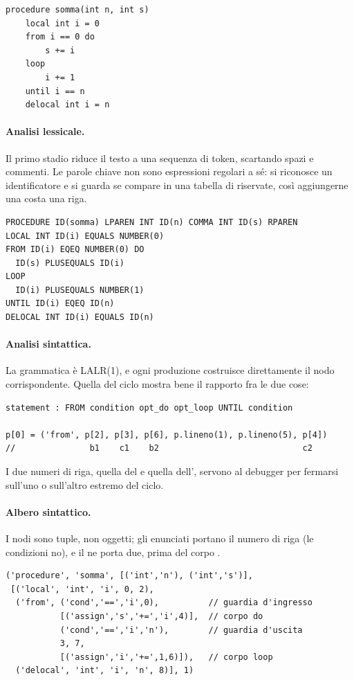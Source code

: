 \begin{lstlisting}
procedure somma(int n, int s)
    local int i = 0
    from i == 0 do
        s += i
    loop
        i += 1
    until i == n
    delocal int i = n
\end{lstlisting}

\paragraph{Analisi lessicale.} Il primo stadio riduce il testo a una sequenza di
token, scartando spazi e commenti. Le parole chiave non sono espressioni
regolari a sé: si riconosce un identificatore e si guarda se compare in una
tabella di riservate, così aggiungerne una costa una riga.

\begin{lstlisting}
PROCEDURE ID(somma) LPAREN INT ID(n) COMMA INT ID(s) RPAREN
LOCAL INT ID(i) EQUALS NUMBER(0)
FROM ID(i) EQEQ NUMBER(0) DO
  ID(s) PLUSEQUALS ID(i)
LOOP
  ID(i) PLUSEQUALS NUMBER(1)
UNTIL ID(i) EQEQ ID(n)
DELOCAL INT ID(i) EQUALS ID(n)
\end{lstlisting}

\paragraph{Analisi sintattica.} La grammatica è LALR(1), e ogni produzione
costruisce direttamente il nodo corrispondente. Quella del ciclo mostra bene il
rapporto fra le due cose:

\begin{lstlisting}
statement : FROM condition opt_do opt_loop UNTIL condition

p[0] = ('from', p[2], p[3], p[6], p.lineno(1), p.lineno(5), p[4])
//               b1    c1    b2                             c2
\end{lstlisting}

\noindent
I due numeri di riga, quella del  e quella dell',
servono al debugger per fermarsi sull'uno o sull'altro estremo del ciclo.

\paragraph{Albero sintattico.} I nodi sono tuple, non oggetti; gli enunciati
portano il numero di riga (le condizioni no), e il  ne porta due,
prima del corpo .

\begin{lstlisting}
('procedure', 'somma', [('int','n'), ('int','s')],
 [('local', 'int', 'i', 0, 2),
  ('from', ('cond','==','i',0),          // guardia d'ingresso
           [('assign','s','+=','i',4)],  // corpo do
           ('cond','==','i','n'),        // guardia d'uscita
           3, 7,
           [('assign','i','+=',1,6)]),   // corpo loop
  ('delocal', 'int', 'i', 'n', 8)], 1)
\end{lstlisting}

